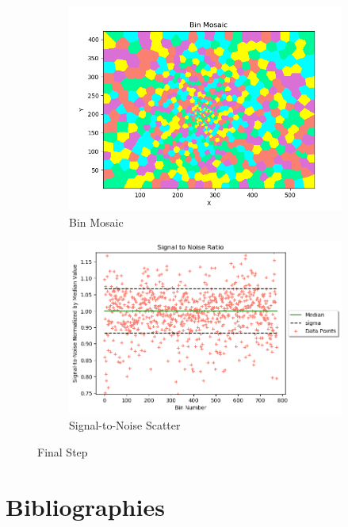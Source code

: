 \documentclass[11pt,letterpaper]{article}
\begin{document}
\begin{figure}
	\centering
	\begin{subfigure}{.5\textwidth}
		\centering
		\includegraphics[width=.9\linewidth]{pictures/final}
		\caption{Bin Mosaic}
		\label{fig:sub1}
	\end{subfigure}%
	\begin{subfigure}{.5\textwidth}
		\centering
		\includegraphics[width=.9\linewidth]{pictures/final_scatter}
		\caption{Signal-to-Noise Scatter}
		\label{fig:sub2}
	\end{subfigure}
	\caption{Final Step}
	\label{fig:test}
\end{figure}

\newpage
\section*{Bibliographies}


\end{document}
